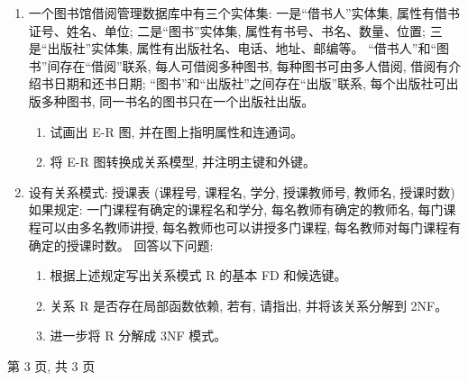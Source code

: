 \documentclass{ctexart} %
\begin{document}
\begin{enumerate}[label=\arabic*.]
    \item 一个图书馆借阅管理数据库中有三个实体集: 一是“借书人”实体集, 属性有借书证号、姓名、单位; 二是“图书”实体集, 属性有书号、书名、数量、位置; 三是“出版社”实体集, 属性有出版社名、电话、地址、邮编等。
    “借书人”和“图书”间存在“借阅”联系, 每人可借阅多种图书, 每种图书可由多人借阅, 借阅有介绍书日期和还书日期; “图书”和“出版社”之间存在“出版”联系, 每个出版社可出版多种图书, 同一书名的图书只在一个出版社出版。
    \begin{enumerate}[label=(\arabic*)]
        \item 试画出 E-R 图, 并在图上指明属性和连通词。 %
        \item 将 E-R 图转换成关系模型, 并注明主键和外键。
    \end{enumerate}

    \item 设有关系模式:
    授课表 (课程号, 课程名, 学分, 授课教师号, 教师名, 授课时数)
    如果规定: 一门课程有确定的课程名和学分, 每名教师有确定的教师名, 每门课程可以由多名教师讲授, 每名教师也可以讲授多门课程, 每名教师对每门课程有确定的授课时数。
    回答以下问题:
    \begin{enumerate}[label=(\arabic*)]
        \item 根据上述规定写出关系模式 R 的基本 FD 和候选键。
        \item 关系 R 是否存在局部函数依赖, 若有, 请指出, 并将该关系分解到 2NF。
        \item 进一步将 R 分解成 3NF 模式。
    \end{enumerate}
\end{enumerate}


\vfill
\centering
第 3 页, 共 3 页
\end{document}
